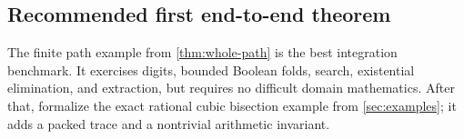 \subsection{Recommended first end-to-end theorem}

The finite path example from \cref{thm:whole-path} is the best integration
benchmark.  It exercises digits, bounded Boolean folds, search, existential
elimination, and extraction, but requires no difficult domain mathematics.
After that, formalize the exact rational cubic bisection example from
\cref{sec:examples}; it adds a packed trace and a nontrivial arithmetic
invariant.

